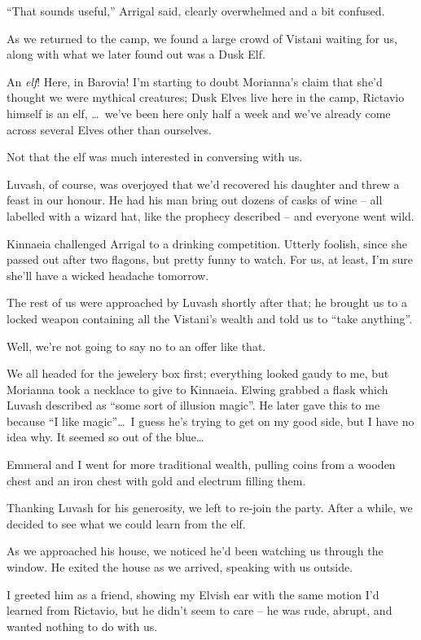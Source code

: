 ``That sounds useful,'' Arrigal said, clearly overwhelmed and a bit confused.

As we returned to the camp, we found a large crowd of Vistani waiting for us, along with what we later found out was a Dusk Elf.

An \emph{elf}! Here, in Barovia! I'm starting to doubt Morianna's claim that she'd thought we were mythical creatures; Dusk Elves live here in the camp, Rictavio himself is an elf, \dots\ we've been here only half a week and we've already come across several Elves other than ourselves.

Not that the elf was much interested in conversing with us.

Luvash, of course, was overjoyed that we'd recovered his daughter and threw a feast in our honour. He had his man bring out dozens of casks of wine -- all labelled with a wizard hat, like the prophecy described -- and everyone went wild.

Kinnaeia challenged Arrigal to a drinking competition. Utterly foolish, since she passed out after two flagons, but pretty funny to watch. For us, at least, I'm sure she'll have a wicked headache tomorrow.

The rest of us were approached by Luvash shortly after that; he brought us to a locked weapon containing all the Vistani's wealth and told us to ``take anything''.

Well, we're not going to say no to an offer like that.

We all headed for the jewelery box first; everything looked gaudy to me, but Morianna took a necklace to give to Kinnaeia. Elwing grabbed a flask which Luvash described as ``some sort of illusion magic''. He later gave this to me because ``I like magic''\dots\ I guess he's trying to get on my good side, but I have no idea why. It seemed so out of the blue\dots

Emmeral and I went for more traditional wealth, pulling coins from a wooden chest and an iron chest with gold and electrum filling them.

Thanking Luvash for his generosity, we left to re-join the party. After a while, we decided to see what we could learn from the elf.

As we approached his house, we noticed he'd been watching us through the window. He exited the house as we arrived, speaking with us outside.

I greeted him as a friend, showing my Elvish ear with the same motion I'd learned from Rictavio, but he didn't seem to care -- he was rude, abrupt, and wanted nothing to do with us.

